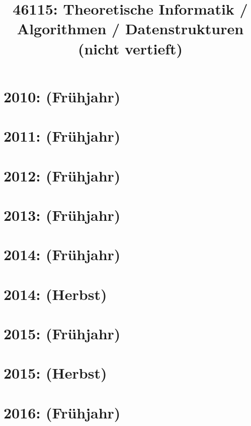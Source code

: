 \documentclass{lehramt-informatik-haupt}
\title{46115: Theoretische Informatik / Algorithmen / Datenstrukturen (nicht vertieft)}
\begin{document}
\maketitle
\tableofcontents

\section{2010: (Frühjahr)}


\section{2011: (Frühjahr)}


\section{2012: (Frühjahr)}


\section{2013: (Frühjahr)}


\section{2014: (Frühjahr)}


\section{2014: (Herbst)}


\section{2015: (Frühjahr)}


\section{2015: (Herbst)}


\section{2016: (Frühjahr)}

\end{document}
